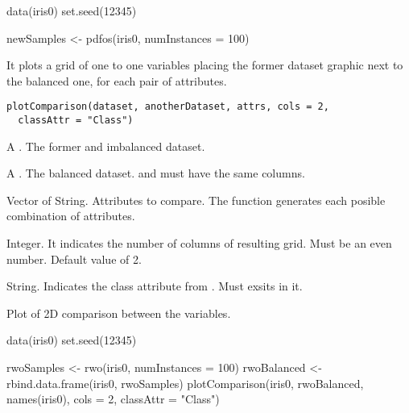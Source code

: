 %
\begin{Examples}
\begin{ExampleCode}
data(iris0)
set.seed(12345)

newSamples <- pdfos(iris0, numInstances = 100)

\end{ExampleCode}
\end{Examples}
%
\begin{Description}\relax
It plots a grid of one to one variables placing the former dataset graphic
next to the balanced one, for each pair of attributes.
\end{Description}
%
\begin{Usage}
\begin{verbatim}
plotComparison(dataset, anotherDataset, attrs, cols = 2,
  classAttr = "Class")
\end{verbatim}
\end{Usage}
%
\begin{Arguments}
\begin{ldescription}
\item[\code{dataset}] A . The former and imbalanced dataset.

\item[\code{anotherDataset}] A . The balanced dataset. 
and  must have the same columns.

\item[\code{attrs}] Vector of String. Attributes to compare. The function generates
each posible combination of attributes.

\item[\code{cols}] Integer. It indicates the number of columns of resulting grid.
Must be an even number. Default value of 2.

\item[\code{classAttr}] String. Indicates the class attribute from .
Must exsits in it.
\end{ldescription}
\end{Arguments}
%
\begin{Value}
Plot of 2D comparison between the variables.
\end{Value}
%
\begin{Examples}
\begin{ExampleCode}
data(iris0)
set.seed(12345)

rwoSamples <- rwo(iris0, numInstances = 100)
rwoBalanced <- rbind.data.frame(iris0, rwoSamples)
plotComparison(iris0, rwoBalanced, names(iris0), cols = 2, classAttr = "Class")

\end{ExampleCode}
\end{Examples}
